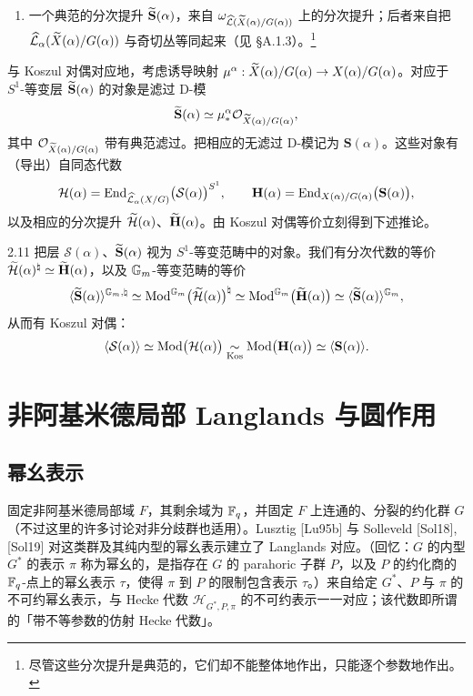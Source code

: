 \begin{enumerate}[label=(\arabic*),leftmargin=2.6em,start=3,itemsep=0.2em]
\item 一个典范的分次提升 $\widetilde{\mathbf S}(\alpha)$，来自 $\omega_{\widehat{\mathcal{L}}(\widetilde X(\alpha)/G(\alpha))}$ 上的分次提升；后者来自把 $\widehat{\mathcal{L}}_\alpha(\widetilde X(\alpha)/G(\alpha))$ 与奇切丛等同起来（见 §A.1.3）。\footnote{尽管这些分次提升是典范的，它们却不能整体地作出，只能逐个参数地作出。}
\end{enumerate}

与 Koszul 对偶对应地，考虑诱导映射 $\mu^\alpha:\widetilde X(\alpha)/G(\alpha)\to X(\alpha)/G(\alpha)$。对应于 $S^1$-等变层 $\widetilde{\mathbf S}(\alpha)$ 的对象是滤过 D-模
\[
\widetilde{\mathbf S}(\alpha)\simeq\mu^\alpha_*\mathcal{O}_{\widetilde X(\alpha)/G(\alpha)},
\]
其中 $\mathcal{O}_{\widetilde X(\alpha)/G(\alpha)}$ 带有典范滤过。把相应的无滤过 D-模记为 $\mathbf S(\alpha)$。这些对象有（导出）自同态代数
\[
\mathcal H(\alpha)=\operatorname{End}_{\widehat{\mathcal{L}}_\alpha(X/G)}\bigl(\mathcal S(\alpha)\bigr)^{S^1},\qquad
\mathbf H(\alpha)=\operatorname{End}_{X(\alpha)/G(\alpha)}\bigl(\mathbf S(\alpha)\bigr),
\]
以及相应的分次提升 $\widetilde{\mathcal H}(\alpha)$、$\widetilde{\mathbf H}(\alpha)$。由 Koszul 对偶等价立刻得到下述推论。

\begin{cor}{2.11}\label{cor:a5-02-1}
把层 $\mathcal S(\alpha)$、$\widetilde{\mathbf S}(\alpha)$ 视为 $S^1$-等变范畴中的对象。我们有分次代数的等价 $\widetilde{\mathcal H}(\alpha)^\natural\simeq\widetilde{\mathbf H}(\alpha)$，以及 $\mathbb{G}_m$-等变范畴的等价
\[
\langle\widetilde{\mathbf S}(\alpha)\rangle^{\mathbb{G}_m,\natural}\simeq\operatorname{Mod}^{\mathbb{G}_m}\bigl(\widetilde{\mathcal H}(\alpha)\bigr)^\natural\simeq\operatorname{Mod}^{\mathbb{G}_m}\bigl(\widetilde{\mathbf H}(\alpha)\bigr)\simeq\langle\widetilde{\mathbf S}(\alpha)\rangle^{\mathbb{G}_m},
\]
从而有 Koszul 对偶：
\[
\langle\mathcal S(\alpha)\rangle\simeq\operatorname{Mod}\bigl(\mathcal H(\alpha)\bigr)\underset{\mathrm{Kos}}{\sim}\operatorname{Mod}\bigl(\mathbf H(\alpha)\bigr)\simeq\langle\mathbf S(\alpha)\rangle.
\]
\end{cor}

\section{非阿基米德局部 Langlands 与圆作用}
\subsection{幂幺表示}
固定非阿基米德局部域 $F$，其剩余域为 $\mathbb{F}_q$，并固定 $F$ 上连通的、分裂的约化群 $G$（不过这里的许多讨论对非分歧群也适用）。Lusztig [Lu95b] 与 Solleveld [Sol18], [Sol19] 对这类群及其纯内型的幂幺表示建立了 Langlands 对应。（回忆：$G$ 的内型 $G^*$ 的表示 $\pi$ 称为幂幺的，是指存在 $G$ 的 parahoric 子群 $P$，以及 $P$ 的约化商的 $\mathbb{F}_q$-点上的幂幺表示 $\tau$，使得 $\pi$ 到 $P$ 的限制包含表示 $\tau$。）来自给定 $G^*$、$P$ 与 $\pi$ 的不可约幂幺表示，与 Hecke 代数 $\mathcal H_{G^*,P,\pi}$ 的不可约表示一一对应；该代数即所谓的「带不等参数的仿射 Hecke 代数」。

